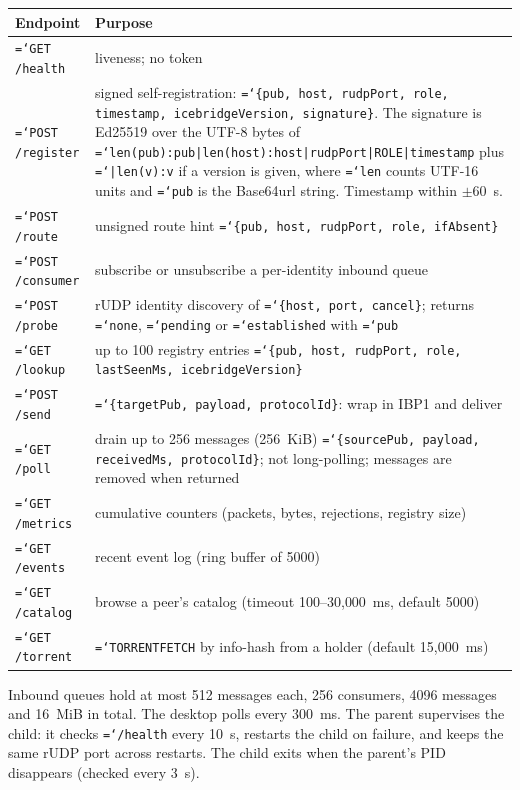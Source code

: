 \documentclass[11pt,a4paper]{article}
\newcommand{\code}[1]{\texttt{\hyphenchar\font=`\-\relax #1}}
\DeclareRobustCommand{\_}{\origunderscore\allowbreak}
\begin{document}
\begin{longtable}{p{}p{}}
\toprule
Endpoint & Purpose\\
\midrule\endhead
\code{GET /health} & liveness; no token\\
\code{POST /register} & signed self-registration: \code{\{pub, host, rudpPort, role, timestamp, icebridgeVersion, signature\}}. The signature is Ed25519 over the UTF-8 bytes of \code{len(pub):pub|len(host):host|rudpPort|ROLE|timestamp} plus \code{|len(v):v} if a version is given, where \code{len} counts UTF-16 units and \code{pub} is the Base64url string. Timestamp within $\pm 60$~s.\\
\code{POST /route} & unsigned route hint \code{\{pub, host, rudpPort, role, ifAbsent\}}\\
\code{POST /consumer} & subscribe or unsubscribe a per-identity inbound queue\\
\code{POST /probe} & rUDP identity discovery of \code{\{host, port, cancel\}}; returns \code{none}, \code{pending} or \code{established} with \code{pub}\\
\code{GET /lookup} & up to 100 registry entries \code{\{pub, host, rudpPort, role, lastSeenMs, icebridgeVersion\}}\\
\code{POST /send} & \code{\{targetPub, payload, protocolId\}}: wrap in IBP1 and deliver\\
\code{GET /poll} & drain up to 256 messages (256~KiB) \code{\{sourcePub, payload, receivedMs, protocolId\}}; not long-polling; messages are removed when returned\\
\code{GET /metrics} & cumulative counters (packets, bytes, rejections, registry size)\\
\code{GET /events} & recent event log (ring buffer of 5000)\\
\code{GET /catalog} & browse a peer's catalog (timeout 100--30{,}000~ms, default 5000)\\
\code{GET /torrent} & \code{TORRENT\_FETCH} by info-hash from a holder (default 15{,}000~ms)\\
\bottomrule
\end{longtable}

Inbound queues hold at most 512 messages each, 256 consumers, 4096 messages and 16~MiB in
total. The desktop polls every 300~ms. The parent supervises the child: it checks
\code{/health} every 10~s, restarts the child on failure, and keeps the same rUDP port across
restarts. The child exits when the parent's PID disappears (checked every 3~s).
\end{document}
